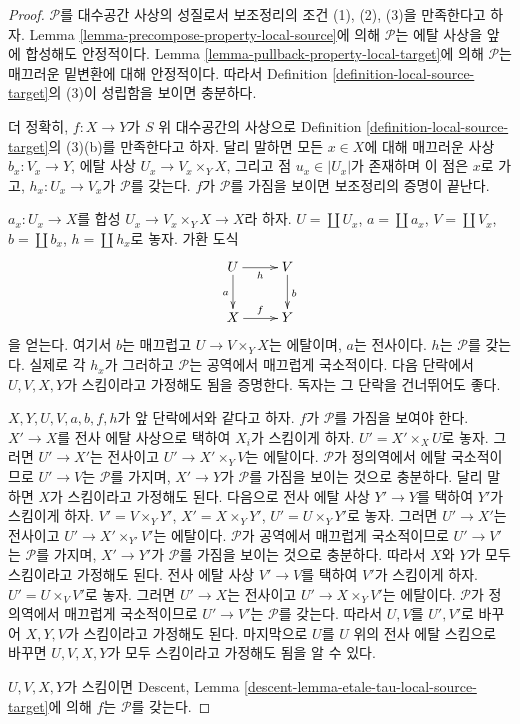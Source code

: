 \begin{proof}
$\mathcal{P}$를 대수공간 사상의 성질로서 보조정리의 조건 (1), (2),
(3)을 만족한다고 하자. Lemma \ref{lemma-precompose-property-local-source}에
의해 $\mathcal{P}$는 에탈 사상을 앞에 합성해도 안정적이다. Lemma
\ref{lemma-pullback-property-local-target}에 의해 $\mathcal{P}$는 매끄러운
밑변환에 대해 안정적이다. 따라서
Definition \ref{definition-local-source-target}의 (3)이 성립함을 보이면
충분하다.

\medskip\noindent
더 정확히, $f:X\to Y$가 $S$ 위 대수공간의 사상으로 Definition
\ref{definition-local-source-target}의 (3)(b)를 만족한다고 하자. 달리
말하면 모든
$x\in X$에 대해 매끄러운 사상 $b_x:V_x\to Y$, 에탈 사상
$U_x\to V_x\times_YX$, 그리고 점 $u_x\in|U_x|$가 존재하며 이 점은 $x$로 가고,
$h_x:U_x\to V_x$가 $\mathcal{P}$를 갖는다. $f$가 $\mathcal{P}$를 가짐을
보이면 보조정리의 증명이 끝난다.

\medskip\noindent
$a_x:U_x\to X$를 합성 $U_x\to V_x\times_YX\to X$라 하자.
$U=\coprod U_x$, $a=\coprod a_x$, $V=\coprod V_x$,
$b=\coprod b_x$, $h=\coprod h_x$로 놓자. 가환 도식
$$
\xymatrix{
U \ar[d]_a \ar[r]_h & V \ar[d]^b \\
X \ar[r]^f & Y
}
$$
을 얻는다. 여기서 $b$는 매끄럽고 $U\to V\times_YX$는 에탈이며,
$a$는 전사이다. $h$는 $\mathcal{P}$를 갖는다. 실제로 각 $h_x$가
그러하고 $\mathcal{P}$는 공역에서 매끄럽게 국소적이다. 다음 단락에서
$U,V,X,Y$가 스킴이라고 가정해도 됨을 증명한다. 독자는 그 단락을
건너뛰어도 좋다.

\medskip\noindent
$X,Y,U,V,a,b,f,h$가 앞 단락에서와 같다고 하자. $f$가 $\mathcal{P}$를
가짐을 보여야 한다. $X'\to X$를 전사 에탈 사상으로 택하여
$X_i$가 스킴이게 하자. $U'=X'\times_XU$로 놓자. 그러면
$U'\to X'$는 전사이고 $U'\to X'\times_YV$는 에탈이다. $\mathcal{P}$가
정의역에서 에탈 국소적이므로 $U'\to V$는 $\mathcal{P}$를 가지며,
$X'\to Y$가 $\mathcal{P}$를 가짐을 보이는 것으로 충분하다. 달리 말하면
$X$가 스킴이라고 가정해도 된다. 다음으로 전사 에탈 사상 $Y'\to Y$를
택하여 $Y'$가 스킴이게 하자. $V'=V\times_YY'$,
$X'=X\times_YY'$, $U'=U\times_YY'$로 놓자. 그러면 $U'\to X'$는 전사이고
$U'\to X'\times_{Y'}V'$는 에탈이다. $\mathcal{P}$가 공역에서 매끄럽게
국소적이므로 $U'\to V'$는 $\mathcal{P}$를 가지며, $X'\to Y'$가
$\mathcal{P}$를 가짐을 보이는 것으로 충분하다. 따라서 $X$와 $Y$가 모두
스킴이라고 가정해도 된다. 전사 에탈 사상 $V'\to V$를 택하여 $V'$가
스킴이게 하자. $U'=U\times_VV'$로 놓자. 그러면 $U'\to X$는 전사이고
$U'\to X\times_YV'$는 에탈이다.
$\mathcal{P}$가 정의역에서 매끄럽게 국소적이므로 $U'\to V'$는
$\mathcal{P}$를 갖는다. 따라서 $U,V$를 $U',V'$로 바꾸어 $X,Y,V$가
스킴이라고 가정해도 된다. 마지막으로 $U$를 $U$ 위의 전사 에탈 스킴으로
바꾸면 $U,V,X,Y$가 모두 스킴이라고 가정해도 됨을 알 수 있다.

\medskip\noindent
$U,V,X,Y$가 스킴이면 Descent, Lemma
\ref{descent-lemma-etale-tau-local-source-target}에 의해 $f$는
$\mathcal{P}$를 갖는다.
\end{proof}

